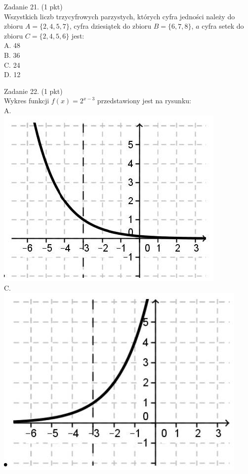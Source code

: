 \documentclass[10pt]{article}
\begin{document}
Zadanie 21. (1 pkt)\\
Wszystkich liczb trzycyfrowych parzystych, których cyfra jedności należy do zbioru \(A=\{2,4,5,7\}\), cyfra dziesiątek do zbioru \(B=\{6,7,8\}\), \(a\) cyfra setek do zbioru \(C=\{2,4,5,6\}\) jest:\\
A. 48\\
B. 36\\
C. 24\\
D. 12

Zadanie 22. (1 pkt)\\
Wykres funkcji \(f(x)=2^{x-3}\) przedstawiony jest na rysunku:\\
A.\\
\includegraphics[max width=\textwidth, center]{2024_11_21_9a9f600c3b3af5013d80g-08(3)}\\
C.\\
\includegraphics[max width=\textwidth, center]{2024_11_21_9a9f600c3b3af5013d80g-08(2)}\\
\end{document}
